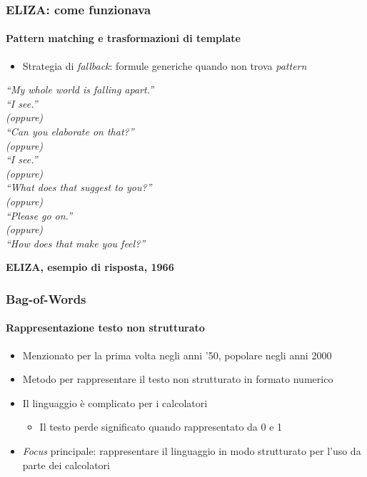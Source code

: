 %
\begin{frame}[t,fragile] \frametitle{ELIZA: come funzionava}
	\framesubtitle{Pattern matching e trasformazioni di template}
	{\small
		\begin{itemize}[leftmargin=10pt,align=right]
			\item[\alert{\faArrowCircleRight}] \alert{Strategia di \textit{fallback}:} formule generiche quando non trova \textit{pattern}
		\end{itemize}
		\vspace*{.3cm}
		\hspace*{4cm}
		\begin{minipage}[t]{.6\textwidth}
			\renewcommand{\epigraphsize}{\scriptsize}
			\setlength{\afterepigraphskip}{0pt}
			\setlength{\beforeepigraphskip}{5pt}
			\setlength{\epigraphwidth}{0.9\textwidth}
			\epigraph{\textit{\alert{\faUser} ``\alert{My} whole world is falling apart.''\\
			\alert{\faTerminal} ``I see.''\\
			(oppure)\\
			\alert{\faTerminal} ``Can you elaborate on that?''\\
			(oppure)\\
			\alert{\faTerminal} ``I see.''\\
			(oppure)\\
			\alert{\faTerminal} ``What does that suggest to you?''\\
			(oppure)\\
			\alert{\faTerminal} ``Please go on.''\\
			(oppure)\\
			\alert{\faTerminal} ``How does that make you feel?''
			}}{\textbf{ELIZA, esempio di risposta, 1966}}
		\end{minipage}
	}
\end{frame}
%
\begin{frame}[t,fragile] \frametitle{Bag-of-Words}
    \framesubtitle{Rappresentazione testo non strutturato}
	{\small
		\begin{minipage}[t]{\textwidth}
	    	\begin{itemize}[leftmargin=10pt,align=right]
				\onslide<1->\item[\alert{\faArrowCircleRight}] Menzionato per la prima volta negli anni '50, popolare negli anni 2000
				\onslide<2->\item[\alert{\faArrowCircleRight}] Metodo per rappresentare il testo \alert{non strutturato} in formato numerico
				\onslide<3->\item[\alert{\faArrowCircleRight}] Il \alert{linguaggio è complicato} per i calcolatori
				\begin{itemize}[leftmargin=10pt,align=right]
					\item[\alert{\faArrowCircleRight}] Il testo perde significato quando rappresentato da 0 e 1
				\end{itemize}
				\item[\alert{\faArrowCircleRight}] \alert{\textit{Focus} principale:} rappresentare il linguaggio in \alert{modo strutturato} per l'uso da parte dei calcolatori
			\end{itemize}
        \end{minipage}
	}
\end{frame}
